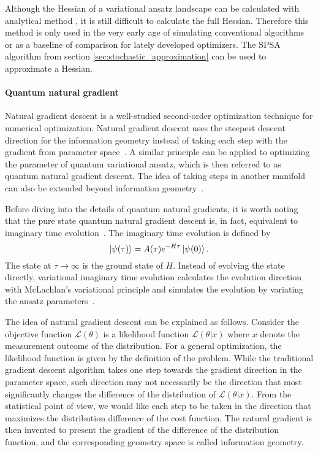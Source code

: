 \vspace{0.5cm}

Although the Hessian of a variational ansatz landscape can be calculated with analytical method \cite{huembeli_characterizing_2021}, it is still difficult to calculate the full Hessian. Therefore this method is only used in the very early age of simulating conventional algorithms or as a baseline of comparison for lately developed optimizers. The SPSA algorithm from section \ref{sec:stochastic_approximation} can be used to approximate a Hessian.

\paragraph{Quantum natural gradient}

Natural gradient descent is a well-studied second-order optimization technique for numerical optimization. Natural gradient descent uses the steepest descent direction for the information geometry instead of taking each step with the gradient from parameter space~\cite{amari_natural_1998,martens_new_2020,wierichs_avoiding_2020}. A similar principle can be applied to optimizing the parameter of quantum variational ansatz, which is then referred to as quantum natural gradient descent. The idea of taking steps in another manifold can also be extended beyond information geometry~\cite{Wiersema2022OptimizingGradientFlow}.

Before diving into the details of quantum natural gradients, it is worth noting that the pure state quantum natural gradient descent is, in fact, equivalent to imaginary time evolution~\cite{stokes_quantum_2020}.
The imaginary time evolution is defined by
\begin{equation}
    \ket{\psi(\tau)} = A(\tau)e^{-H\tau}\ket{\psi(0)}.
\end{equation}
The state at $\tau \rightarrow \infty$ is the ground state of $H$. Instead of evolving the state directly, variational imaginary time evolution calculates the evolution direction with McLachlan's variational principle and simulates the evolution by variating the ansatz parameters~\cite{McArdle2019}.

The idea of natural gradient descent can be explained as follows. Consider the objective function $\mathcal{L}(\theta)$ is a likelihood function $\mathcal{L}(\theta|x)$ where $x$ denote the measurement outcome of the distribution. For a general optimization, the likelihood function is given by the definition of the problem. While the traditional gradient descent algorithm takes one step towards the gradient direction in the parameter space, such direction may not necessarily be the direction that most significantly changes the difference of the distribution of $\mathcal{L}(\theta|x)$. From the statistical point of view, we would like each step to be taken in the direction that maximizes the distribution difference of the cost function. The natural gradient is then invented to present the gradient of the difference of the distribution function, and the corresponding geometry space is called information geometry.


